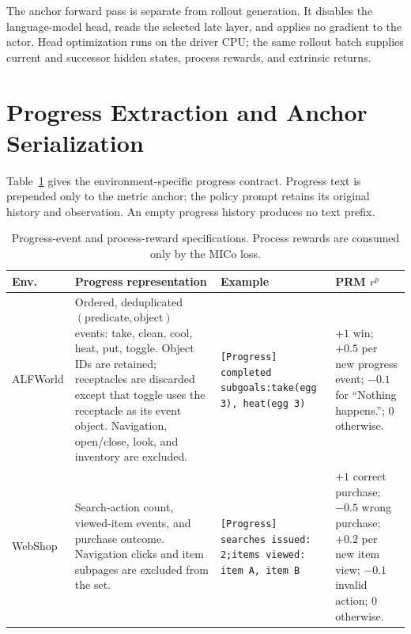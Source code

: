 The anchor forward pass is separate from rollout generation. It disables the language-model head, reads the selected late layer, and applies no gradient to the actor. Head optimization runs on the driver CPU; the same rollout batch supplies current and successor hidden states, process rewards, and extrinsic returns.

\section{Progress Extraction and Anchor Serialization}
\label{app:progress}

Table~\ref{tab:progress_rules} gives the environment-specific progress contract. Progress text is prepended only to the metric anchor; the policy prompt retains its original history and observation. An empty progress history produces no text prefix.

\begin{table}[h]
\centering
\caption{Progress-event and process-reward specifications. Process rewards are consumed only by the MICo loss.}
\label{tab:progress_rules}
\scriptsize
\renewcommand{\arraystretch}{1.18}
\setlength{\tabcolsep}{3.5pt}
\begin{tabular}{@{}p{1.55cm}p{5.05cm}p{4.65cm}p{4.35cm}@{}}
\toprule
Env. & Progress representation & Example & PRM $r^p$ \\
\midrule
ALFWorld & {\raggedright Ordered, deduplicated $(\mathrm{predicate},\mathrm{object})$ events: take, clean, cool, heat, put, toggle. Object IDs are retained; receptacles are discarded except that toggle uses the receptacle as its event object. Navigation, open/close, look, and inventory are excluded.} &
{\raggedright\texttt{[Progress] completed subgoals:\newline take(egg 3), heat(egg 3)}} &
{\raggedright $+1$ win; $+0.5$ per new progress event; $-0.1$ for ``Nothing happens.''; $0$ otherwise.} \\
WebShop & {\raggedright Search-action count, viewed-item events, and purchase outcome. Navigation clicks and item subpages are excluded from the set.} &
{\raggedright\texttt{[Progress] searches issued: 2;\newline items viewed: item A, item B}} &
{\raggedright $+1$ correct purchase; $-0.5$ wrong purchase; $+0.2$ per new item view; $-0.1$ invalid action; $0$ otherwise.} \\
\bottomrule
\end{tabular}
\end{table}

